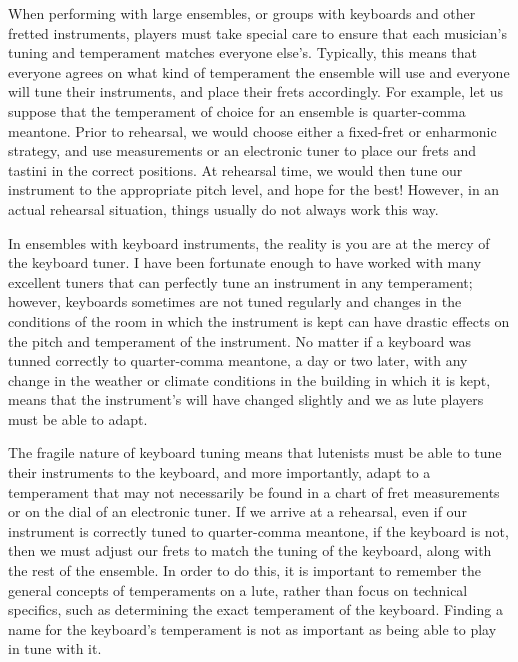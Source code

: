 When performing with large ensembles, or groups with keyboards and other fretted instruments,
players must take special care to ensure that each musician's tuning and temperament matches
everyone else's. Typically, this means that everyone agrees on what kind of temperament the ensemble
will use and everyone will tune their instruments, and place their frets accordingly.  For example,
let us suppose that the temperament of choice for an ensemble is quarter-comma meantone.  Prior to
rehearsal, we would choose either a fixed-fret or enharmonic strategy, and use measurements or an
electronic tuner to place our frets and tastini in the correct positions.  At rehearsal time, we
would then tune our instrument to the appropriate pitch level, and hope for the best!  However, in
an actual rehearsal situation, things usually do not always work this way.

In ensembles with keyboard instruments, the reality is you are at the mercy of the keyboard
tuner.  I have been fortunate enough to have worked with many excellent tuners that can perfectly
tune an instrument in any temperament; however, keyboards sometimes are not tuned regularly and
changes in the conditions of the room in which the instrument is kept can have drastic effects
on the pitch and temperament of the instrument.  No matter if a keyboard was tunned correctly to
quarter-comma meantone, a day or two later, with any change in the weather or climate conditions
in the building in which it is kept, means that the instrument's will have changed slightly
and we as lute players must be able to adapt.

The fragile nature of keyboard tuning means that lutenists must be able to tune their instruments
to the keyboard, and more importantly, adapt to a temperament that may not necessarily be found
in a chart of fret measurements or on the dial of an electronic tuner.  If we arrive at a rehearsal,
even if our instrument is correctly tuned to quarter-comma meantone, if the keyboard is not, then
we must adjust our frets to match the tuning of the keyboard, along with the rest of the ensemble.
In order to do this, it is important to remember the general concepts of temperaments on a lute,
rather than focus on technical specifics, such as determining the exact temperament of the 
keyboard.  Finding a name for the keyboard's temperament is not as important as being able to
play in tune with it.

